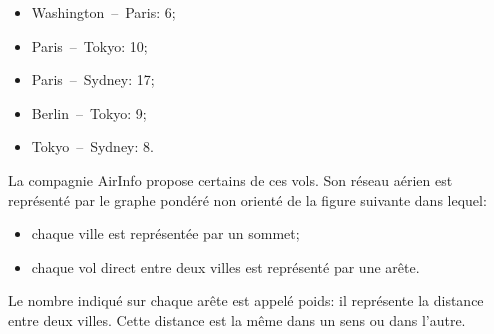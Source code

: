 \begin{minipage}{0.35\linewidth}
    \begin{itemize}
    \item Washington~--~Paris: 6;
    \item Paris~--~Tokyo: 10;
    \item Paris~--~Sydney: 17;
    \item Berlin~--~Tokyo: 9;
    \item Tokyo~--~Sydney: 8.
\end{itemize}
\end{minipage}
\hfill
\begin{minipage}{0.6\linewidth}
    \centering
    \label{reseau_aerien}

\end{minipage}

\medskip

La compagnie AirInfo propose certains de ces vols. Son réseau aérien est représenté par le graphe pondéré non orienté de la figure suivante dans lequel:
\begin{itemize}
    \item chaque ville est représentée par un sommet;
    \item chaque vol direct entre deux villes est représenté par une arête.
\end{itemize}
Le nombre indiqué sur chaque arête est appelé poids: il représente la distance entre deux villes. Cette distance est la même dans un sens ou dans l'autre.

\smallskip

